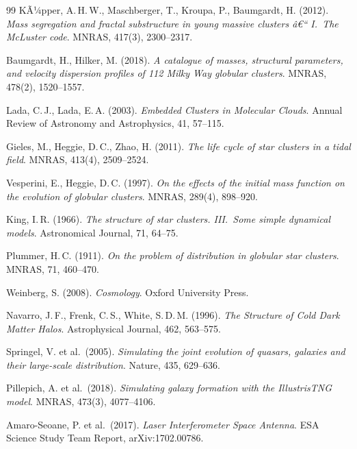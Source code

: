 ﻿\documentclass[a4paper,12pt]{report}
\theoremstyle{definition}
\begin{document}
\begin{thebibliography}{99}
KÃ¼pper, A.\,H.\,W., Maschberger, T., Kroupa, P., Baumgardt, H. (2012). \textit{Mass segregation and fractal substructure in young massive clusters â€“ I.\ The McLuster code}. MNRAS, 417(3), 2300--2317.

Baumgardt, H., Hilker, M. (2018). \textit{A catalogue of masses, structural parameters, and velocity dispersion profiles of 112 Milky Way globular clusters}. MNRAS, 478(2), 1520--1557.

Lada, C.\,J., Lada, E.\,A. (2003). \textit{Embedded Clusters in Molecular Clouds}. Annual Review of Astronomy and Astrophysics, 41, 57--115.

Gieles, M., Heggie, D.\,C., Zhao, H. (2011). \textit{The life cycle of star clusters in a tidal field}. MNRAS, 413(4), 2509--2524.

Vesperini, E., Heggie, D.\,C. (1997). \textit{On the effects of the initial mass function on the evolution of globular clusters}. MNRAS, 289(4), 898--920.

King, I.\,R. (1966). \textit{The structure of star clusters. III.\ Some simple dynamical models}. Astronomical Journal, 71, 64--75.

Plummer, H.\,C. (1911). \textit{On the problem of distribution in globular star clusters}. MNRAS, 71, 460--470.


Weinberg, S. (2008). \textit{Cosmology}. Oxford University Press.

Navarro, J.\,F., Frenk, C.\,S., White, S.\,D.\,M. (1996). \textit{The Structure of Cold Dark Matter Halos}. Astrophysical Journal, 462, 563--575.

Springel, V. et al.\ (2005). \textit{Simulating the joint evolution of quasars, galaxies and their large-scale distribution}. Nature, 435, 629--636.

Pillepich, A. et al.\ (2018). \textit{Simulating galaxy formation with the IllustrisTNG model}. MNRAS, 473(3), 4077--4106.


Amaro-Seoane, P. et al.\ (2017). \textit{Laser Interferometer Space Antenna}. ESA Science Study Team Report, arXiv:1702.00786.


\end{thebibliography}
\end{document}
